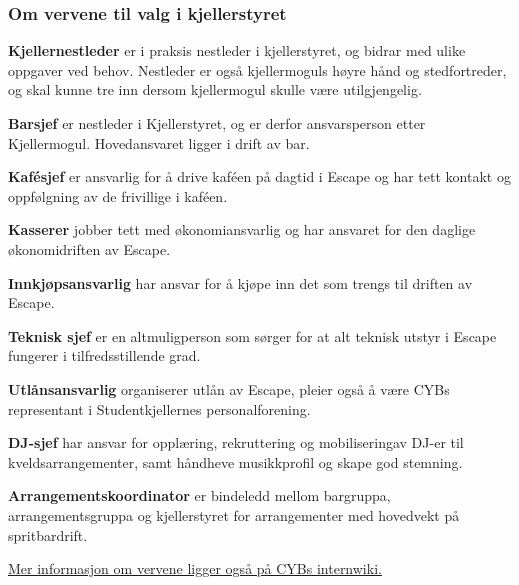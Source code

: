 \documentclass[12pt, norsk, a4paper]{proc}
\begin{document}
\hypertarget{om-vervene-i-kjellerstyret}{%
\subsubsection*{Om vervene til valg i kjellerstyret}\label{om-vervene-i-kjellerstyret}}

\textbf{Kjellernestleder} er i praksis nestleder i kjellerstyret, og bidrar med ulike oppgaver ved behov. Nestleder er også kjellermoguls høyre hånd og stedfortreder, og skal kunne tre inn dersom kjellermogul skulle være utilgjengelig.

\textbf{Barsjef} er nestleder i Kjellerstyret, og er derfor ansvarsperson etter Kjellermogul. Hovedansvaret ligger i drift av bar.

\textbf{Kafésjef} er ansvarlig for å drive kaféen på dagtid i Escape og har tett kontakt og oppfølgning av de frivillige i kaféen.

\textbf{Kasserer} jobber tett med økonomiansvarlig og har ansvaret for den daglige økonomidriften av Escape.

\textbf{Innkjøpsansvarlig} har ansvar for å kjøpe inn det som trengs til driften av Escape.

\textbf{Teknisk sjef} er en altmuligperson som sørger for at alt teknisk utstyr i Escape fungerer i tilfredsstillende grad.

\textbf{Utlånsansvarlig} organiserer utlån av Escape, pleier også å være CYBs representant i Studentkjellernes personalforening.

\textbf{DJ-sjef} har ansvar for opplæring, rekruttering og mobiliseringav DJ-er til kveldsarrangementer, samt håndheve musikkprofil og skape god stemning.

\textbf{Arrangementskoordinator} er bindeledd mellom bargruppa, arrangementsgruppa og kjellerstyret for arrangementer med hovedvekt på spritbardrift.

\href{https://wiki.cyb.no/display/AKTIV/Vervoversikt}{Mer informasjon om vervene ligger også på CYBs internwiki.}
\end{document}
